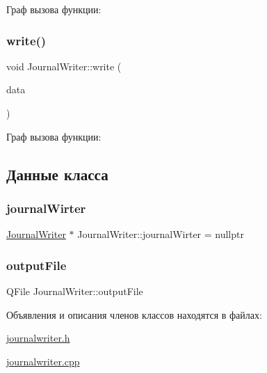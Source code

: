 Граф вызова функции\+:
\mbox{\label{class_journal_writer_a635b3ca7a9ecc19b1827fa0e98bc09f6}} 
\subsubsection{\texorpdfstring{write()}{write()}}
{\footnotesize\ttfamily void Journal\+Writer\+::write (\begin{DoxyParamCaption}\item[{Q\+Byte\+Array}]{data }\end{DoxyParamCaption})}

Граф вызова функции\+:


\subsection{Данные класса}
\mbox{\label{class_journal_writer_a45bf8cd477467fdc28964126438a071a}} 
\subsubsection{\texorpdfstring{journal\+Wirter}{journalWirter}}
{\footnotesize\ttfamily \hyperlink{class_journal_writer}{Journal\+Writer} $\ast$ Journal\+Writer\+::journal\+Wirter = nullptr\hspace{0.3cm}{\ttfamily [static]}}

\mbox{\label{class_journal_writer_a4e2e6d2d0208bd4d168004cd9b403fd4}} 
\subsubsection{\texorpdfstring{output\+File}{outputFile}}
{\footnotesize\ttfamily Q\+File Journal\+Writer\+::output\+File}



Объявления и описания членов классов находятся в файлах\+:\begin{DoxyCompactItemize}
\item 
\hyperlink{journalwriter_8h}{journalwriter.\+h}\item 
\hyperlink{journalwriter_8cpp}{journalwriter.\+cpp}\end{DoxyCompactItemize}
